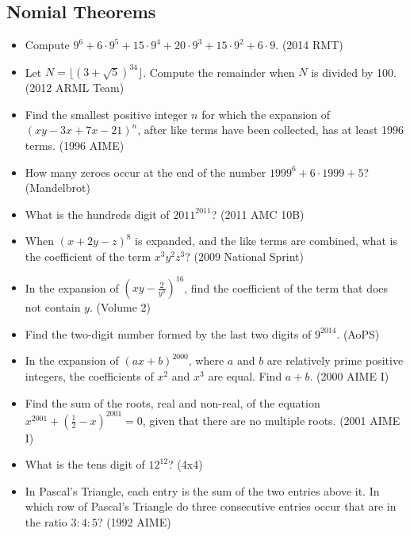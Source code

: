 \documentclass{article}
\begin{document}
\subsection{Nomial Theorems}


\begin{itemize}

\item Compute $9^6+6\cdot 9^5+15\cdot 9^4+20\cdot 9^3+15\cdot 9^2+6\cdot 9$. (2014 RMT)

\item Let $N=\lfloor (3+\sqrt{5})^{34}\rfloor$. Compute the remainder when $N$ is divided by 100. (2012 ARML Team)

\item Find the smallest positive integer $n$ for which the expansion of $(xy-3x+7x-21)^n$, after like terms have been collected, has at least 1996 terms. (1996 AIME)

\item How many zeroes occur at the end of the number $1999^6+6\cdot 1999+5$? (Mandelbrot)

\item What is the hundreds digit of $2011^{2011}$? (2011 AMC 10B)

\item When $(x+2y-z)^8$ is expanded, and the like terms are combined, what is the coefficient of the term $x^3y^2z^3$? (2009 National Sprint)

\item In the expansion of $(xy-\frac{2}{y^3})^{16}$, find the coefficient of the term that does not contain $y$. (Volume 2)


\item Find the two-digit number formed by the last two digits of $9^{2014}$. (AoPS)

\item In the expansion of $(ax+b)^{2000}$, where $a$ and $b$ are relatively prime positive integers, the coefficients of $x^2$ and $x^3$ are equal. Find $a+b$. (2000 AIME I)

\item Find the sum of the roots, real and non-real, of the equation $x^{2001}+\left(\frac 12-x\right)^{2001}=0$, given that there are no multiple roots. (2001 AIME I)


\item What is the tens digit of $12^{12}$? (4x4)

\item In Pascal's Triangle, each entry is the sum of the two entries above it. In which row of Pascal's Triangle do three consecutive entries occur that are in the ratio $3:4:5$? (1992 AIME)

\end{itemize}
\end{document}
